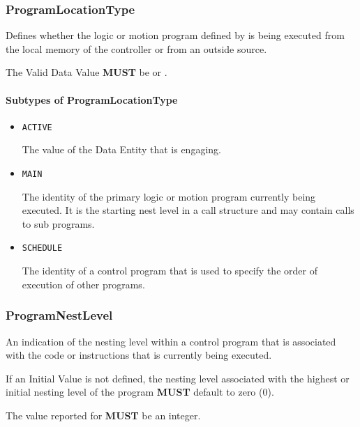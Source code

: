 \subsubsection{ProgramLocationType}
\label{sec:ProgramLocationType}



Defines whether the logic or motion program defined by  is being executed from the local memory of the controller or from an outside source.
  
 The \gls{Valid Data Value} \textbf{MUST} be  or .


\paragraph{Subtypes of ProgramLocationType}\mbox{}
\label{sec:Subtypes of ProgramLocationType}

\begin{itemize}

\item \texttt{ACTIVE}


The value of the \gls{Data Entity} that is engaging.

\item \texttt{MAIN}


The identity of the primary logic or motion program currently being executed. It is the starting nest level in a call structure and may contain calls to sub programs.

\item \texttt{SCHEDULE}


The identity of a control program that is used to specify the order of execution of other programs.


\end{itemize}

\subsubsection{ProgramNestLevel}
\label{sec:ProgramNestLevel}



An indication of the nesting level within a control program that is associated with the code or instructions that is currently being executed.
  
 If an Initial Value is not defined, the nesting level associated with the highest or initial nesting level of the program \textbf{MUST} default to zero (0).
  
 The value reported for  \textbf{MUST} be an integer.


